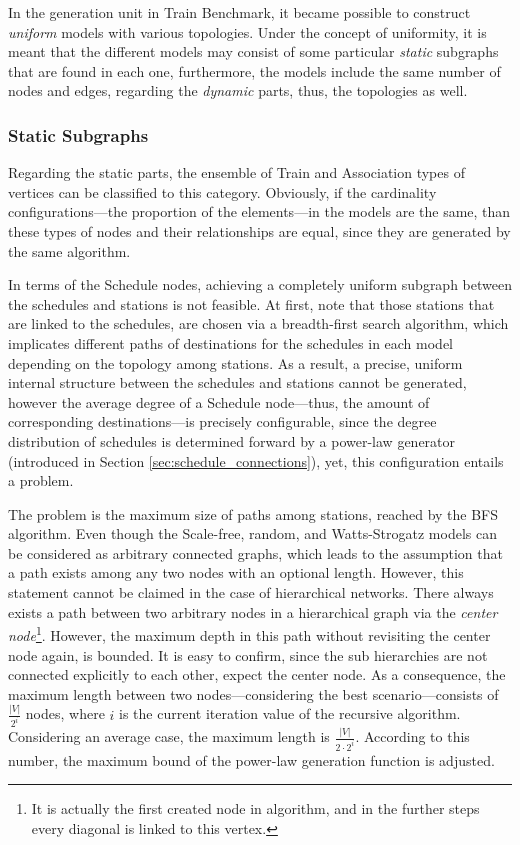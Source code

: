 In the generation unit in Train Benchmark, it became possible to construct \textit{uniform} models with various topologies. Under the concept of uniformity, it is meant that the different models may consist of some particular \textit{static} subgraphs that are found in each one, furthermore, the models include the same number of nodes and edges, regarding the \textit{dynamic} parts, thus, the topologies as well.


\subsubsection{Static Subgraphs}
Regarding the static parts, the ensemble of \textsf{Train} and \textsf{Association} types of vertices can be classified to this category. Obviously, if the cardinality configurations---the proportion of the elements---in the models are the same, than these types of nodes and their relationships are equal, since they are generated by the same algorithm.

In terms of the \textsf{Schedule} nodes, achieving a completely uniform subgraph between the schedules and stations is not feasible. At first, note that those stations that are linked to the schedules, are chosen via a breadth-first search algorithm, which implicates different paths of destinations for the schedules in each model depending on the topology among stations. As a result, a precise, uniform internal structure between the schedules and stations cannot be generated, however the average degree of a \textsf{Schedule} node---thus, the amount of corresponding destinations---is precisely configurable, since the degree distribution of schedules is determined forward by a power-law generator (introduced in Section \ref{sec:schedule_connections}), yet, this configuration entails a problem.

The problem is the maximum size of paths among stations, reached by the BFS algorithm. Even though the Scale-free, random, and Watts-Strogatz models can be considered as arbitrary connected graphs, which leads to the assumption that a path exists among any two nodes with an optional length. However, this statement cannot be claimed in the case of hierarchical networks. There always exists a path between two arbitrary nodes in a hierarchical graph via the \textit{center node}\footnote{It is actually the first created node in algorithm, and in the further steps every diagonal is linked to this vertex.}. However, the maximum depth in this path without revisiting the center node again, is bounded. It is easy to confirm, since the sub hierarchies are not connected explicitly to each other, expect the center node. As a consequence, the maximum length between two nodes---considering the best scenario---consists of $\frac{|V|}{2^i}$ nodes, where $i$ is the current iteration value of the recursive algorithm. Considering an average case, the maximum length is $\frac{|V|}{2 \cdot 2^i}$. According to this number, the maximum bound of the power-law generation function is adjusted.

